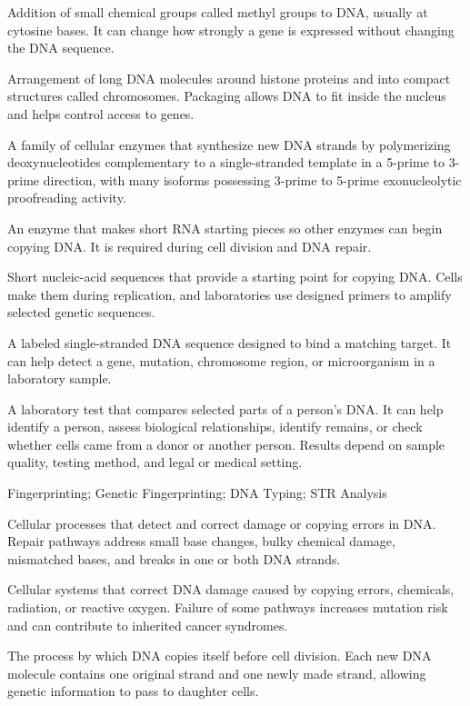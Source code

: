  Addition of small chemical groups called methyl groups to DNA, usually at cytosine bases. It can change how strongly a gene is expressed without changing the DNA sequence.

 Arrangement of long DNA molecules around histone proteins and into compact structures called chromosomes. Packaging allows DNA to fit inside the nucleus and helps control access to genes.

 A family of cellular enzymes that synthesize new DNA strands by polymerizing deoxynucleotides complementary to a single-stranded template in a 5-prime to 3-prime direction, with many isoforms possessing 3-prime to 5-prime exonucleolytic proofreading activity.

 An enzyme that makes short RNA starting pieces so other enzymes can begin copying DNA. It is required during cell division and DNA repair.

 Short nucleic-acid sequences that provide a starting point for copying DNA. Cells make them during replication, and laboratories use designed primers to amplify selected genetic sequences.

 A labeled single-stranded DNA sequence designed to bind a matching target. It can help detect a gene, mutation, chromosome region, or microorganism in a laboratory sample.

 A laboratory test that compares selected parts of a person's DNA. It can help identify a person, assess biological relationships, identify remains, or check whether cells came from a donor or another person. Results depend on sample quality, testing method, and legal or medical setting.

\synonyms
 Fingerprinting; Genetic Fingerprinting; DNA Typing; STR Analysis

 Cellular processes that detect and correct damage or copying errors in DNA. Repair pathways address small base changes, bulky chemical damage, mismatched bases, and breaks in one or both DNA strands.

 Cellular systems that correct DNA damage caused by copying errors, chemicals, radiation, or reactive oxygen. Failure of some pathways increases mutation risk and can contribute to inherited cancer syndromes.

 The process by which DNA copies itself before cell division. Each new DNA molecule contains one original strand and one newly made strand, allowing genetic information to pass to daughter cells.

